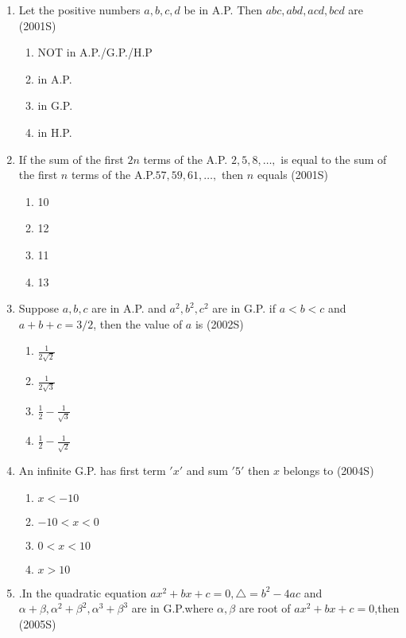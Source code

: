 \documentclass[journal,12pt,twocolumn]{IEEEtran}
\theoremstyle{remark}
\begin{document}
\begin{enumerate}
\begin{enumerate}
    \end{enumerate}
\item Let the positive numbers $a,b,c,d$ be in A.P. Then $abc,abd,acd,bcd$ are \hfill(2001S)
    \begin{enumerate}
        \item NOT in A.P./G.P./H.P
        \item in A.P.
        \item in G.P.
        \item  in H.P.
        \end{enumerate}
\item If the sum of the first $2n$ terms of the A.P. $2,5,8,\dots,$ is equal to the sum of the first $n$ terms of the A.P.$57,59,61,\dots,$ then $n$ equals \hfill(2001S)
        \begin{enumerate}
            \item 10
            \item 12
            \item 11
            \item 13
            \end{enumerate}
\item Suppose $a,b,c$ are in A.P. and $a^2,b^2,c^2$ are in G.P. if $a<b<c$ and $a+b+c=3/2$, then the value of $a$ is \hfill(2002S)
            \begin{enumerate}
             \item $\frac{1}{2\sqrt{2}}$
             \item $\frac{1}{2\sqrt{3}}$
             \item $\frac{1}{2}-\frac{1}{\sqrt{3}}$
             \item $\frac{1}{2}-\frac{1}{\sqrt{2}}$
            \end{enumerate}
\item An infinite G.P. has first term $'x'$ and sum $'5'$ then $x$ belongs to \hfill(2004S)
            \begin{enumerate}
                \item $x<-10$
                \item $-10<x<0$
                \item $0<x<10$
                \item $x>10$
                \end{enumerate}
\item .In the quadratic equation $ax^2+bx+c=0,\triangle=b^2-4ac$ and $\alpha+\beta,\alpha^2+\beta^2,\alpha^3+\beta^3$ are in G.P.where $\alpha,\beta $ are root of $ax^2+bx+c=0$,then \hfill(2005S)

\end{enumerate}
\end{document}
